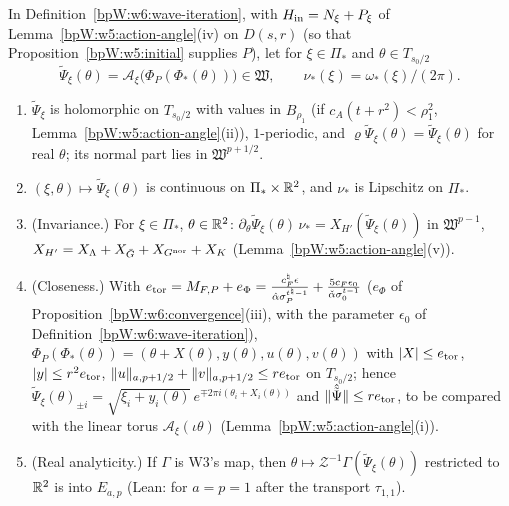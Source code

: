\begin{theorem}\label{bpW:w6:tori}
In Definition~\ref{bpW:w6:wave-iteration}, with $H_{\rm in}=N_\xi+P_\xi$ of Lemma~\ref{bpW:w5:action-angle}(iv) on $D(s,r)$ (so that
Proposition~\ref{bpW:w5:initial} supplies $P$), let for $\xi\in\Pi_*$ and $\theta\in T_{s_0/2}$
\[\tilde\Psi_\xi(\theta)=\mathcal A_\xi\bigl(\Phi_P(\Phi_*(\theta))\bigr)\in\mathfrak W,\qquad\nu_*(\xi)=\omega_*(\xi)/(2\pi).\]
\begin{enumerate}[label=(\roman*)]
\item $\tilde\Psi_\xi$ is holomorphic on $T_{s_0/2}$ with values in $B_{\rho_1}$ (if $c_A(t+r^2)<\rho_1^2$, Lemma~\ref{bpW:w5:action-angle}(ii)),
  $1$-periodic, and $\varrho\tilde\Psi_\xi(\theta)=\tilde\Psi_\xi(\theta)$ for real $\theta$; its normal part lies in $\mathfrak W^{p+1/2}$.
\item $(\xi,\theta)\mapsto\tilde\Psi_\xi(\theta)$ is continuous on $\Pi_*\times\mathbb{R}^2$, and $\nu_*$ is Lipschitz on $\Pi_*$.
\item (Invariance.) For $\xi\in\Pi_*$, $\theta\in\mathbb{R}^2$: $\partial_\theta\tilde\Psi_\xi(\theta)\,\nu_*=X_{H'}(\tilde\Psi_\xi(\theta))$ in $\mathfrak W^{p-1}$,
  $X_{H'}=X_\Lambda+X_{\bar G}+X_{G^{\rm nor}}+X_K$ (Lemma~\ref{bpW:w5:action-angle}(v)).
\item (Closeness.) With $e_{\rm tor}=M_{F,P}+e_\Phi=\frac{c^\natural_F\epsilon}{\hat\alpha\sigma_P^{t^\natural-1}}+\frac{5c_F\epsilon_0}{\check\alpha\sigma_0^{t-1}}$
  ($e_\Phi$ of Proposition~\ref{bpW:w6:convergence}(iii), with the parameter $\epsilon_0$ of Definition~\ref{bpW:w6:wave-iteration}),
  $\Phi_P(\Phi_*(\theta))=(\theta+X(\theta),y(\theta),u(\theta),v(\theta))$ with
  $\lvert X\rvert\le e_{\rm tor}$, $\lvert y\rvert\le r^2e_{\rm tor}$, $\lVert u\rVert_{a,p+1/2}+\lVert v\rVert_{a,p+1/2}\le re_{\rm tor}$ on $T_{s_0/2}$; hence
  $\tilde\Psi_\xi(\theta)_{\pm i}=\sqrt{\xi_i+y_i(\theta)}\,e^{\mp2\pi i(\theta_i+X_i(\theta))}$ and $\lVert \hat{\tilde\Psi}\rVert\le re_{\rm tor}$, to be compared
  with the linear torus $\mathcal A_\xi(\iota\theta)$ (Lemma~\ref{bpW:w5:action-angle}(i)).
\item (Real analyticity.) If $\Gamma$ is W3's map, then $\theta\mapsto\mathcal Z^{-1}\Gamma(\tilde\Psi_\xi(\theta))$ restricted to $\mathbb{R}^2$ is
   into $E_{a,p}$ (Lean:  for $a=p=1$ after the transport $\tau_{1,1}$).
\end{enumerate}
\end{theorem}
